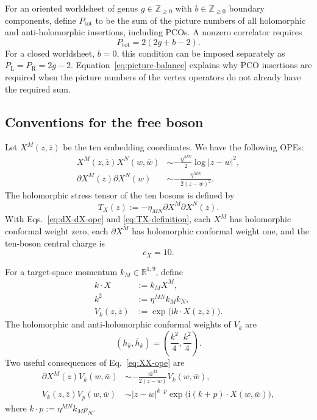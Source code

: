 \documentclass[12pt]{article}
\numberwithin{equation}{section}
\renewcommand{\i}{\mathrm{i}}
\begin{document}
For an oriented worldsheet of genus $g\in\mathbb{Z}_{\geq0}$ with
$b\in\mathbb{Z}_{\geq0}$ boundary components, define $P_{\mathrm{tot}}$ to
be the sum of the picture numbers of all holomorphic and anti-holomorphic
insertions, including PCOs.  A nonzero correlator requires
\begin{equation}
P_{\mathrm{tot}}=2(2g+b-2).
\label{eq:picture-balance}
\end{equation}
For a closed worldsheet, $b=0$, this condition can be imposed separately as
$P_{\mathrm L}=P_{\mathrm R}=2g-2$.  Equation~\eqref{eq:picture-balance}
explains why PCO insertions are required when the picture numbers of the
vertex operators do not already have the required sum.

\subsection{Conventions for the free boson}
\label{sec:free-boson}

Let $X^M(z,\bar z)$ be the ten embedding coordinates.
We have the following OPEs:
\begin{align}
X^M(z,\bar z)X^N(w,\bar w)
&\sim
-\frac{\eta^{MN}}{2}\log |z-w|^2,
\label{eq:XX-ope}
\\
\partial X^M(z)\partial X^N(w)
&\sim
-\frac{\eta^{MN}}{2(z-w)^2}.
\label{eq:dX-dX-ope}
\end{align}
The holomorphic stress tensor of the ten bosons
is defined by
\begin{equation}
T_X(z):=-\eta_{MN}\partial X^M\partial X^N(z).
\label{eq:TX-definition}
\end{equation}
With Eqs.~\eqref{eq:dX-dX-ope} and \eqref{eq:TX-definition}, each $X^M$ has
holomorphic conformal weight zero, each $\partial X^M$ has holomorphic
conformal weight one, and the ten-boson central charge is
\begin{equation}
c_X=10.
\label{eq:cX}
\end{equation}

For a target-space momentum $k_M\in\mathbb{R}^{1,9}$, define
\begin{align}
k\mathbin{\cdot}X
&:=k_MX^M,
\label{eq:k-dot-X}
\\
k^2
&:=\eta^{MN}k_Mk_N,
\label{eq:k-squared}
\\
V_k(z,\bar z)
&:=\exp\!\bigl(\i k\mathbin{\cdot}X(z,\bar z)\bigr).
\label{eq:momentum-vertex}
\end{align}
The holomorphic and anti-holomorphic conformal weights of $V_k$ are
\begin{equation}
(h_k,\bar h_k)=\left(\frac{k^2}{4},\frac{k^2}{4}\right).
\label{eq:momentum-vertex-weight}
\end{equation}
Two useful consequences of Eq.~\eqref{eq:XX-ope} are
\begin{align}
\partial X^M(z)V_k(w,\bar w)
&\sim
-\frac{\i k^M}{2(z-w)}V_k(w,\bar w),
\label{eq:dX-V-ope}
\\
V_k(z,\bar z)V_p(w,\bar w)
&\sim
|z-w|^{k\cdot p}
\exp\!\bigl(\i(k+p)\mathbin{\cdot}X(w,\bar w)\bigr),
\label{eq:V-V-ope}
\end{align}
where $k\cdot p:=\eta^{MN}k_Mp_N$.
\end{document}
